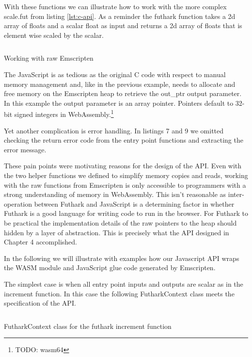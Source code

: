 \documentclass[11pt]{book}
\begin{document}
With these functions we can illustrate how to work with the more complex scale.fut from listing \ref{lst:c-api}. As a reminder the futhark function takes a 2d array of floats and a scalar float as input and returns a 2d array of floats that is element wise scaled by the scalar. 

\begin{listing}[H] 
        \inputminted[fontsize=\small,baselinestretch=0.5,linenos]{JavaScript}{code/compiler/api_examples/raw.js}
        \caption{Working with raw Emscripten }
        \label{lst:raw}    
\end{listing} 

The JavaScript is as tedious as the original C code with respect to manual memory management and, like in the previous example, needs to allocate and free memory on the Emscripten heap to retrieve the out\_ptr output parameter. In this example the output parameter is an array pointer. Pointers default to 32-bit signed integers in WebAssembly.\footnote{TODO: wasm64}

Yet another complication is error handling. In listings 7 and 9 we omitted checking the return error code from the entry point functions and extracting the error message. 

These pain points were motivating reasons for the design of the API. Even with the two helper functions we defined to simplify memory copies and reads, working with the raw functions from Emscripten is only accessible to programmers with a strong understanding of memory in WebAssembly. This isn't reasonable as inter-operation between Futhark and JavaScript is a determining factor in whether Futhark is a good language for writing code to run in the browser. For Futhark to be practical the implementation details of the raw pointers to the heap should hidden by a layer of abstraction. This is precisely what the API designed in Chapter 4 accomplished. 

In the following we will illustrate with examples how our Javascript API wraps the WASM module and JavaScript glue code generated by Emscripten.

The simplest case is when all entry point inputs and outputs are scalar as in the increment function. In this case the following FutharkContext class meets the specification of the API.

\begin{listing}[H] 
        \inputminted[fontsize=\small,baselinestretch=0.5,linenos]{JavaScript}{code/compiler/api_examples/FutharkContext_incr.js}
        \caption{FutharkContext class for the futhark increment function}
        \label{lst:FutharkContext_incr}    
\end{listing} 
\end{document}
